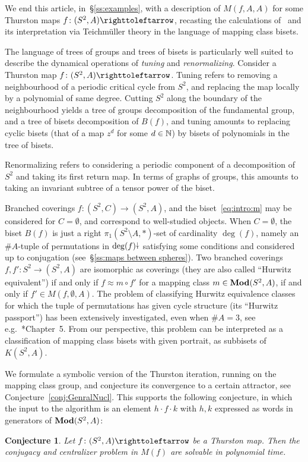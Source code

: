 \documentclass{amsart}
\begin{document}
We end this article, in~\S\ref{ss:examples}, with a description of
$M(f,A,A)$ for some Thurston maps $f\colon(S^2,A)\selfmap$, recasting
the calculations of~\cite{bartholdi-n:thurston} and its interpretation
via Teichm\"uller theory in the language of mapping class
bisets.

The language of trees of groups and trees of bisets is particularly
well suited to describe the dynamical operations of \emph{tuning} and
\emph{renormalizing}. Consider a Thurston map
$f\colon (S^2,A)\selfmap$. Tuning refers to removing a neighbourhood
of a periodic critical cycle from $S^2$, and replacing the map locally
by a polynomial of same degree. Cutting $S^2$ along the boundary of
the neighbourhood yields a tree of groups decomposition of the
fundamental group, and a tree of bisets decomposition of $B(f)$, and
tuning amounts to replacing cyclic bisets (that of a map $z^d$ for
some $d\in{\mathbb N}$) by bisets of polynomials in the tree of bisets.

Renormalizing refers to considering a periodic component of a
decomposition of $S^2$ and taking its first return map. In terms of
graphs of groups, this amounts to taking an invariant subtree of a
tensor power of the biset.

Branched coverings $f\colon(S^2,C)\to(S^2,A)$, and the
biset~\eqref{eq:intro:m} may be considered for $C=\emptyset$, and
correspond to well-studied objects. When $C=\emptyset$, the biset
$B(f)$ is just a right $\pi_1(S^2\setminus A,*)$-set of cardinality
$\deg(f)$, namely an $\#A$-tuple of permutations in $\deg(f){\stackrel{\downarrow}{\smash.}}$
satisfying some conditions and considered up to conjugation
(see~\S\ref{ss:maps between spheres}). Two branched coverings
$f,f'\colon S^2\to(S^2,A)$ are isomorphic as coverings (they are also
called ``Hurwitz equivalent'') if and only if $f\approx m\circ f'$ for
a mapping class $m\in\mathbf{\relax Mod}(S^2,A)$, if and only if
$f'\in M(f,\emptyset,A)$. The problem of classifying Hurwitz
equivalence classes for which the tuple of permutations has given
cycle structure (its ``Hurwitz passport'') has been extensively
investigated, even when $\#A=3$, see
e.g.~\cite{lando-zvonkin:graphsonsurfaces}*{Chapter~5}. From our
perspective, this problem can be interpreted as a classification of
mapping class bisets with given portrait, as subbisets of $K(S^2,A)$.

We formulate a symbolic version of the Thurston iteration, running on
the mapping class group, and conjecture its convergence to a certain
attractor, see Conjecture~\ref{conj:GenralNucl}. This supports the
following conjecture, in which the input to the algorithm is an
element $h\cdot f\cdot k$ with $h,k$ expressed as words in generators
of $\mathbf{\relax Mod}(S^2,A)$:
\newtheorem{mainconj}[mainthm]{Conjecture}
\begin{mainconj}
  Let $f\colon(S^2,A)\selfmap$ be a Thurston map. Then the conjugacy
  and centralizer problem in $M(f)$ are solvable in polynomial time.
\end{mainconj}
\end{document}
